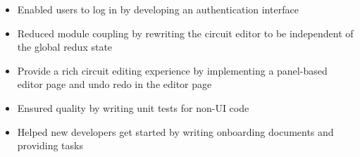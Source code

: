 
\begin{itemize}
  \item Enabled users to log in by developing an authentication interface
  \item Reduced module coupling by rewriting the circuit editor to be independent
  of the global redux state
  \item Provide a rich circuit editing experience by implementing a panel-based
  editor page and undo redo in the editor page
  \item Ensured quality by writing unit tests for non-UI code
  \item Helped new developers get started by writing onboarding documents and
  providing tasks
\end{itemize}
